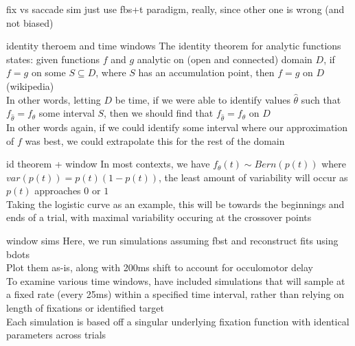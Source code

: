 \documentclass{beamer}
\begin{document}
\begin{frame}{fix vs saccade sim}
just use fbs+t paradigm, really, since other one is wrong (and not biased)
\end{frame}

\begin{frame}{identity theroem and time windows}
The identity theorem for analytic functions states: given functions $f$ and $g$ analytic on (open and connected) domain $D$, if $f = g$ on some $S \subseteq D$, where $S$ has an accumulation point, then $f = g$ on $D$ (wikipedia) \newline \\

In other words, letting $D$ be time, if we were able to identify values $\hat{\theta}$ such that $f_{\hat{\theta}} = f_{\theta}$  some interval $S$, then we should find that $f_{\hat{\theta}} = f_{\theta}$ on $D$ \newline \\

In other words again, if we could identify some interval where our approximation of $f$ was best, we could extrapolate this for the rest of the domain
\end{frame}

\begin{frame}{id theorem + window}
In most contexts, we have $f_{\theta}(t) \sim Bern(p(t))$ where $var(p(t)) = p(t) (1-p(t))$, the least amount of variability will occur as $p(t)$ approaches $0$ or $1$ \newline \\

Taking the logistic curve as an example, this will be towards the beginnings and ends of a trial, with maximal variability occuring at the crossover points
\end{frame}

\begin{frame}{window sims}
Here, we run simulations assuming fbst and reconstruct fits using bdots \newline \\

Plot them as-is, along with 200ms shift to account for occulomotor delay \newline \\

To examine various time windows, have included simulations that will sample at a fixed rate (every 25ms) within a specified time interval, rather than relying on length of fixations or identified target \newline \\

Each simulation is based off a singular underlying fixation function with identical parameters across trials
\end{frame}
\end{document}
